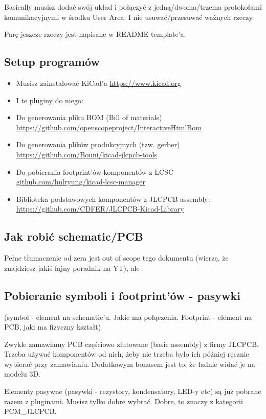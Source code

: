 \documentclass[b5paper, 10pt, twoside]{book}
\begin{document}
Basically musisz dodać swój układ i połączyć z jedną/dwoma/trzema protokołami komunikacyjnymi w środku User Area. I nie usuwać/przesuwać ważnych rzeczy.

Parę jeszcze rzeczy jest napisane w README template'a.

\subsection{Setup programów}
\begin{itemize}
  \item Musisz zainstalować KiCad'a \url{https://www.kicad.org}
  \item I te pluginy do niego:
  \item Do generowania pliku BOM (Bill of materials) \url{https://github.com/openscopeproject/InteractiveHtmlBom}
  \item Do generowania plików produkcyjnych (tzw. gerber) \url{https://github.com/Bouni/kicad-jlcpcb-tools}
  \item Do pobierania footprint'ów komponentów z LCSC \url{github.com/hulryung/kicad-lcsc-manager} 
  \item Biblioteka podstawowych komponentów z JLCPCB assembly: \url{https://github.com/CDFER/JLCPCB-Kicad-Library}
\end{itemize}

\subsection{Jak robić schematic/PCB}
Pełne tłumaczenie od zera jest out of scope tego dokumentu (wierzę, że znajdziesz jakiś fajny poradnik na YT), ale

\subsection{Pobieranie symboli i footprint'ów - pasywki}
(symbol - element na schematic'u. Jakie ma połączenia. Footprint - element na PCB, jaki ma fizyczny kształt)

Zwykle zamawiamy PCB częściowo zlutowane (basic assembly) z firmy JLCPCB. Trzeba używać komponentów od nich, żeby nie trzeba było ich później ręcznie wybierać przy zamawianiu. Dodatkowym bonusem jest to, że ładnie widać je na modelu 3D.

Elementy pasywne (pasywki - rezystory, kondensatory, LED-y etc) są już pobrane razem z pluginami. Musisz tylko dobre wybrać.
Dobre, to znaczy z kategorii PCM\_JLCPCB.
\end{document}
